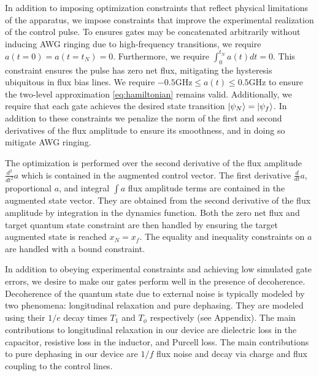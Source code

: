 \documentclass[
  amsfonts,
  amsmath,
  tbtags,
  amssymb,
  aps,
  nobibnotes,
  twocolumn,
  superscriptaddress,
]{revtex4-2}
\begin{document}
In addition to imposing optimization constraints that
reflect physical limitations of the apparatus, we impose
constraints that improve the experimental realization of the control pulse.
To ensures gates may be concatenated arbitrarily without
inducing AWG ringing due to high-frequency transitions,
we require $a(t = 0) = a(t = t_{N}) = 0$.
Furthermore, we require $\int_{0}^{t_{N}} a(t) dt = 0$. This
constraint ensures the pulse has zero net flux, mitigating
the hysteresis ubiquitous in flux bias lines.
We require $-0.5 \textrm{GHz} \le a(t) \le 0.5 \textrm{GHz}$
to ensure the two-level approximation \ref{eq:hamiltonian}
remains valid. Additionally, we require that each gate achieves
the desired state transition $\ket{\psi_{N}} = \ket{\psi_{f}}$.
In addition to these constraints we penalize the norm
of the first and second derivatives of the flux amplitude to
ensure its smoothness, and in doing so mitigate AWG ringing.

The optimization is performed over the second derivative of the flux amplitude
$\frac{d^{2}}{dt^{2}} a$ which is contained in the
augmented control vector. The first derivative
$\frac{d}{dt} a$, proportional $a$, and integral $\int a$
flux amplitude terms
are contained in the augmented state vector. They are obtained from
the second derivative of the flux amplitude by
integration in the dynamics function.
Both the zero net flux and target quantum state constraint
are then handled by ensuring the target augmented state is
reached $x_{N} = x_{f}$.
The equality and inequality constraints on $a$ are handled
with a bound constraint.

In addition to obeying experimental constraints
and achieving low simulated gate errors, we desire
to make our gates perform well in the presence of decoherence.
Decoherence of the quantum state due to external noise
is typically modeled by two phenomena: longitudinal relaxation and pure dephasing.
They are modeled using their $1/e$ decay times $T_{1}$ and $T_{\phi}$ respectively
(see Appendix).
The main contributions to longitudinal relaxation in our
device are dielectric loss in the capacitor, resistive loss in the inductor,
and Purcell loss. The main contributions to pure dephasing in our
device are $1/f$ flux noise and decay via charge and flux coupling
to the control lines.
\end{document}
